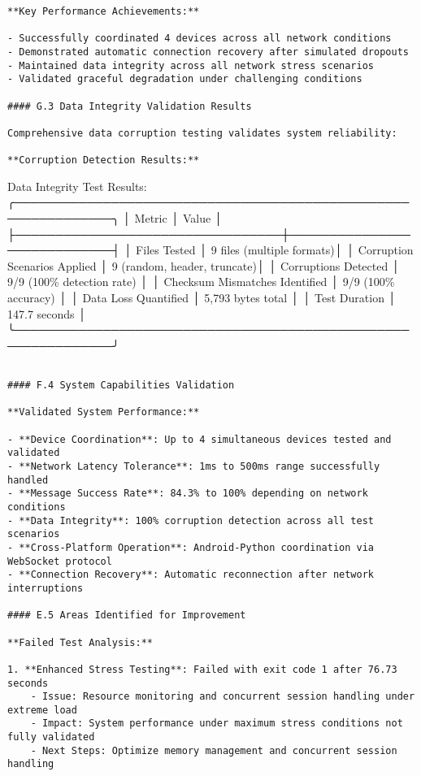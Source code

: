 \documentclass[12pt,a4paper]{article}
\begin{document}
{{\begin{verbatim}
**Key Performance Achievements:**

- Successfully coordinated 4 devices across all network conditions
- Demonstrated automatic connection recovery after simulated dropouts
- Maintained data integrity across all network stress scenarios
- Validated graceful degradation under challenging conditions

#### G.3 Data Integrity Validation Results

Comprehensive data corruption testing validates system reliability:

**Corruption Detection Results:**

\end{verbatim}
Data Integrity Test Results:
╭──────────────────────────────────────────────────────────────╮
│ Metric                          │ Value                      │
├─────────────────────────────────┼────────────────────────────┤
│ Files Tested                    │ 9 files (multiple formats)│
│ Corruption Scenarios Applied    │ 9 (random, header, truncate)│
│ Corruptions Detected           │ 9/9 (100\% detection rate) │
│ Checksum Mismatches Identified │ 9/9 (100\% accuracy)       │
│ Data Loss Quantified           │ 5,793 bytes total          │
│ Test Duration                   │ 147.7 seconds             │
╰──────────────────────────────────────────────────────────────╯
\begin{verbatim}

#### F.4 System Capabilities Validation

**Validated System Performance:**

- **Device Coordination**: Up to 4 simultaneous devices tested and validated
- **Network Latency Tolerance**: 1ms to 500ms range successfully handled
- **Message Success Rate**: 84.3% to 100% depending on network conditions
- **Data Integrity**: 100% corruption detection across all test scenarios
- **Cross-Platform Operation**: Android-Python coordination via WebSocket protocol
- **Connection Recovery**: Automatic reconnection after network interruptions

#### E.5 Areas Identified for Improvement

**Failed Test Analysis:**

1. **Enhanced Stress Testing**: Failed with exit code 1 after 76.73 seconds
    - Issue: Resource monitoring and concurrent session handling under extreme load
    - Impact: System performance under maximum stress conditions not fully validated
    - Next Steps: Optimize memory management and concurrent session handling


\end{verbatim}}}
\end{document}
